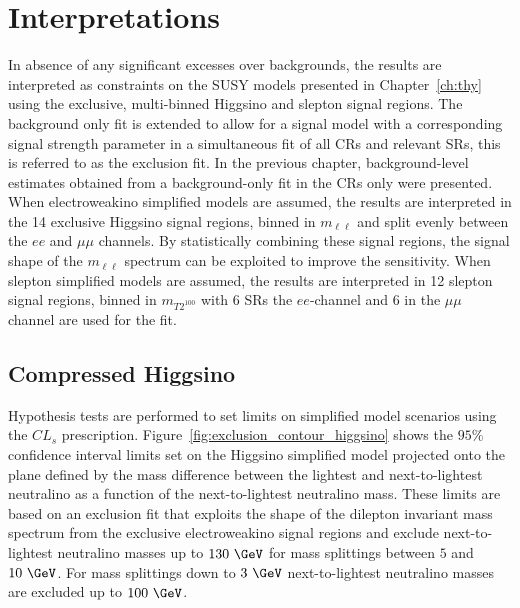 \chapter{Interpretations}
\label{ch:interpretations}

In absence of any significant excesses over backgrounds, the results are interpreted as constraints on the SUSY models presented in Chapter~\ref{ch:thy} using the exclusive, multi-binned Higgsino and slepton signal regions.  The background only fit is extended to allow for a signal model with a corresponding signal strength parameter in a simultaneous fit of all CRs and relevant SRs, this is referred to as the exclusion fit.  In the previous chapter, background-level estimates obtained from a background-only fit in the CRs only were presented.  When electroweakino simplified models are assumed, the results are interpreted in the 14 exclusive Higgsino signal regions, binned in $m_{\ell\ell}$ and split evenly between the $ee$ and $\mu\mu$ channels.  By statistically combining these signal regions, the signal shape of the $m_{\ell\ell}$ spectrum can be exploited to improve the sensitivity. When slepton simplified models are assumed, the results are interpreted in 12 slepton signal regions, binned in $m_{T2^{100}}$ with 6 SRs the $ee$-channel and 6 in the $\mu\mu$ channel are used for the fit.

\section{Compressed Higgsino}
Hypothesis tests are performed to set limits on simplified model scenarios using the $CL_s$ prescription.  Figure~\ref{fig:exclusion_contour_higgsino} shows the $95\%$ confidence interval limits set on the Higgsino simplified model projected onto the plane defined by the mass difference between the lightest and next-to-lightest neutralino as a function of the next-to-lightest neutralino mass.  These limits are based on an exclusion fit that exploits the shape of the dilepton invariant mass spectrum from the exclusive electroweakino signal regions and exclude next-to-lightest neutralino masses up to $130~\GeV$ for mass splittings between $5$ and $10~\GeV$.  For mass splittings down to $3~\GeV$ next-to-lightest neutralino masses are excluded up to $100~\GeV$. 

